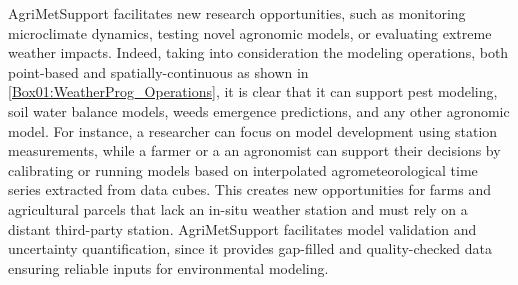 \documentclass[authoryear,preprint,review,12pt]{elsarticle}
\begin{document}
AgriMetSupport facilitates new research opportunities, such as monitoring microclimate dynamics, testing novel agronomic models, or evaluating extreme weather impacts. %
Indeed, taking into consideration the modeling operations, both point-based and spatially-continuous as shown in \cref{Box01:WeatherProg_Operations}, it is clear that it can support pest modeling, soil water balance models, weeds emergence predictions, and any other agronomic model.
For instance, a researcher can focus on model development using station measurements, while a farmer or a an  agronomist can support their decisions by calibrating or running  models based on interpolated agrometeorological time series extracted from data cubes.
This creates new opportunities for farms and agricultural parcels that lack an in-situ weather station and must rely on a distant third-party station.
AgriMetSupport facilitates model validation and uncertainty quantification, since it provides gap-filled and quality-checked data ensuring reliable inputs for environmental modeling.

\end{document}
